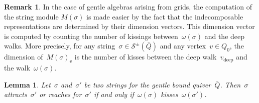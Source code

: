 \documentclass{amsart}
\newtheorem{lemma}[theorem]{Lemma}
\theoremstyle{definition}
\newtheorem{remark}[theorem]{Remark}
\newcommand{\strings}{\mathcal{S}} %
\newcommand{\deep}{\mathrm{deep}} %
\begin{document}
\begin{remark}
In the case of gentle algebras arising from grids, the computation of the string module $M(\sigma)$ is made easier by the fact that the indecomposable representations are determined by their dimension vectors.
This dimension vector is computed by counting the number of kissings between~$\omega(\sigma)$ and the deep walks.
More precisely, for any string~$\sigma \in \strings^\pm(\bar Q)$ and any vertex~$v \in Q_0$, the dimension of~$M(\sigma)_v$ is the number of kisses between the deep walk~$v_\deep$ and the walk~$\omega(\sigma)$.
\end{remark}


\begin{lemma}\label{lem: attract or dance vs kiss}
Let~$\sigma$ and~$\sigma'$ be two strings for the gentle bound quiver~$\bar Q$.
Then~$\sigma$ attracts~$\sigma'$ or reaches for~$\sigma'$ if and only if~$\omega(\sigma)$ kisses~$\omega(\sigma')$.
\end{lemma}
\end{document}
